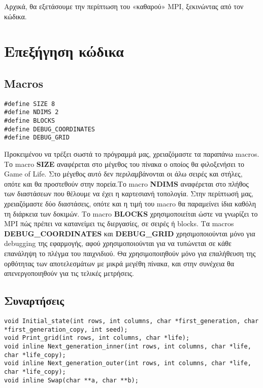 Αρχικά, θα εξετάσουμε την περίπτωση του «καθαρού» MPI, ξεκινώντας από τον κώδικα.
\section{Επεξήγηση κώδικα}

\subsection{Macros} \label{sec:macros}

\begin{tcolorbox}
\begin{verbatim}
#define SIZE 8
#define NDIMS 2
#define BLOCKS
#define DEBUG_COORDINATES
#define DEBUG_GRID
\end{verbatim}
\end{tcolorbox}

\begin{multicols}{2}
Προκειμένου να τρέξει σωστά το πρόγραμμά μας, χρειαζόμαστε τα παραπάνω macros. 
Το macro \textbf{SIZE} αναφέρεται στο μέγεθος του πίνακα ο οποίος θα φιλοξενήσει το Game of Life. Στο μέγεθος αυτό δεν περιλαμβάνονται οι άλω σειρές και στήλες, οπότε και θα προστεθούν στην πορεία.Το macro \textbf{NDIMS} αναφέρεται στο πλήθος των διαστάσεων που θέλουμε να έχει η καρτεσιανή τοπολογία. Στην περίπτωσή μας, χρειαζόμαστε δύο διαστάσεις, οπότε και η τιμή του macro θα παραμείνει ίδια καθόλη τη διάρκεια των δοκιμών. Το macro \textbf{BLOCKS} χρησιμοποιείται ώστε να γνωρίζει το MPI πώς πρέπει να κατανείμει τις διεργασίες, σε σειρές ή blocks. Τα macros \textbf{DEBUG\_COORDINATES} και \textbf{DEBUG\_GRID} χρησιμοποιούνται μόνο για debugging της εφαρμογής, αφού χρησιμοποιούνται για να τυπώνεται σε κάθε επανάληψη το πλέγμα του παιχνιδιού. Θα χρησιμοποιηθούν μόνο για επαλήθευση της ορθότητας των αποτελεσμάτων με μικρά μεγέθη πίνακα, και στην συνέχεια θα απενεργοποιηθούν για τις τελικές μετρήσεις.
\end{multicols}

\subsection{Συναρτήσεις}

\begin{tcolorbox}
\begin{verbatim}
void Initial_state(int rows, int columns, char *first_generation, char *first_generation_copy, int seed);
void Print_grid(int rows, int columns, char *life);
void inline Next_generation_inner(int rows, int columns, char *life, char *life_copy);
void inline Next_generation_outer(int rows, int columns, char *life, char *life_copy);
void inline Swap(char **a, char **b);
\end{verbatim}
\end{tcolorbox}

